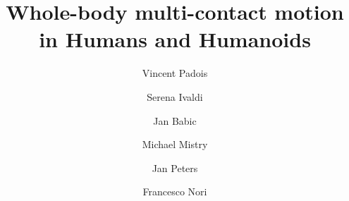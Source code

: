 \documentclass[final,5p,twocolumn]{elsarticle}
\begin{document}
\begin{frontmatter}



\title{Whole-body multi-contact motion in Humans and Humanoids}


\author{Vincent Padois}
\address{Sorbonne Universit\'{e}s, UPMC Univ Paris 06, UMR 7222, Institut des Syst\`{e}mes Intelligents et de Robotique, F-75005, Paris, France\\CNRS, UMR 7222, Institut des Syst\`{e}mes Intelligents et de Robotique F-75005, Paris, France. Email: vincent.padois@upmc.fr }

\author{Serena Ivaldi}
\address{French Institute for Research in Computer Science and Automation (INRIA) Nancy Grand-Est, France. Email: serena.ivaldi@inria.fr}

\author{Jan Babic}
\address{Jozef Stefan Institute, Slovenia. Email: jan.babic@ijs.si}

\author{Michael Mistry }
\address{University of Birmingham, UK Email: m.n.mistry@bham.ac.uk}

\author{Jan Peters}
\address{Max Planck Institute for Intelligent Systems and TU Darmstadt, Germany
Email: mail@jan-peters.net}

\author{Francesco Nori}
\address{Robotics, Brain and Cognitive Science Department Istituto Italiano di Tecnologia. Email: francesco.nori@iit.it}



\end{frontmatter}
\end{document}
